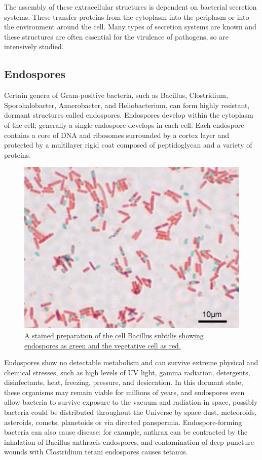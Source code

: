 The assembly of these extracellular structures is dependent on bacterial secretion systems. These transfer proteins from the cytoplasm into the periplasm or into the environment around the cell. Many types of secretion systems are known and these structures are often essential for the virulence of pathogens, so are intensively studied.

\hypertarget{endospores}{%
\subsection{Endospores}\label{endospores}}

Certain genera of Gram-positive bacteria, such as Bacillus, Clostridium, Sporohalobacter, Anaerobacter, and Heliobacterium, can form highly resistant, dormant structures called endospores. Endospores develop within the cytoplasm of the cell; generally a single endospore develops in each cell. Each endospore contains a core of DNA and ribosomes surrounded by a cortex layer and protected by a multilayer rigid coat composed of peptidoglycan and a variety of proteins.



\begin{figure}

{\centering \includegraphics[width=0.7\linewidth]{./figures/bacteria/Bacillus_subtilis_Spore} 

}

\caption{\href{https://commons.wikimedia.org/wiki/File:Bacillus_subtilis_Spore.jpg}{A stained preparation of the cell Bacillus subtilis showing endospores as green and the vegetative cell as red.}}\label{fig:endospore}
\end{figure}

Endospores show no detectable metabolism and can survive extreme physical and chemical stresses, such as high levels of UV light, gamma radiation, detergents, disinfectants, heat, freezing, pressure, and desiccation. In this dormant state, these organisms may remain viable for millions of years, and endospores even allow bacteria to survive exposure to the vacuum and radiation in space, possibly bacteria could be distributed throughout the Universe by space dust, meteoroids, asteroids, comets, planetoids or via directed panspermia. Endospore-forming bacteria can also cause disease: for example, anthrax can be contracted by the inhalation of Bacillus anthracis endospores, and contamination of deep puncture wounds with Clostridium tetani endospores causes tetanus.



